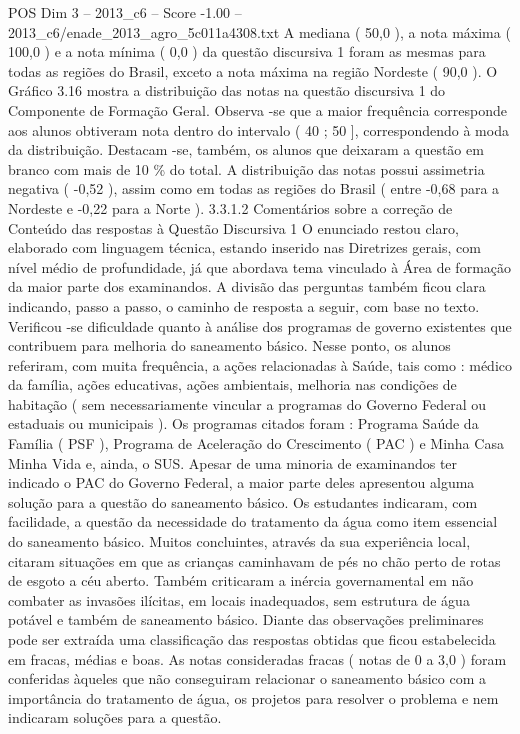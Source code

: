 \begin{textsample}{POS Dim 3 – 2013\_c6 – Score -1.00 – 2013\_c6/enade\_2013\_agro\_5c011a4308.txt}
A mediana ( 50,0 ), a nota máxima ( 100,0 ) e a nota mínima ( 0,0 ) da questão discursiva 1 foram as mesmas para todas as regiões do Brasil, exceto a nota máxima na região Nordeste ( 90,0 ).
O Gráfico 3.16 mostra a distribuição das notas na questão discursiva 1 do Componente de Formação Geral.
Observa -se que a maior frequência corresponde aos alunos obtiveram nota dentro do intervalo ( 40 ; 50 ], correspondendo à moda da distribuição.
Destacam -se, também, os alunos que deixaram a questão em branco com mais de 10 \% do total.
A distribuição das notas possui assimetria negativa ( -0,52 ), assim como em todas as regiões do Brasil ( entre -0,68 para a Nordeste e -0,22 para a Norte ). 3.3.1.2 Comentários sobre a correção de Conteúdo das respostas à Questão Discursiva 1 O enunciado restou claro, elaborado com linguagem técnica, estando inserido nas Diretrizes gerais, com nível médio de profundidade, já que abordava tema vinculado à Área de formação da maior parte dos examinandos.
A divisão das perguntas também ficou clara indicando, passo a passo, o caminho de resposta a seguir, com base no texto.
Verificou -se dificuldade quanto à análise dos programas de governo existentes que contribuem para melhoria do saneamento básico.
Nesse ponto, os alunos referiram, com muita frequência, a ações relacionadas à Saúde, tais como : médico da família, ações educativas, ações ambientais, melhoria nas condições de habitação ( sem necessariamente vincular a programas do Governo Federal ou estaduais ou municipais ).
Os programas citados foram : Programa Saúde da Família ( PSF ), Programa de Aceleração do Crescimento ( PAC ) e Minha Casa Minha Vida e, ainda, o SUS.
Apesar de uma minoria de examinandos ter indicado o PAC do Governo Federal, a maior parte deles apresentou alguma solução para a questão do saneamento básico.
Os estudantes indicaram, com facilidade, a questão da necessidade do tratamento da água como item essencial do saneamento básico.
Muitos concluintes, através da sua experiência local, citaram situações em que as crianças caminhavam de pés no chão perto de rotas de esgoto a céu aberto.
Também criticaram a inércia governamental em não combater as invasões ilícitas, em locais inadequados, sem estrutura de água potável e também de saneamento básico.
Diante das observações preliminares pode ser extraída uma classificação das respostas obtidas que ficou estabelecida em fracas, médias e boas.
As notas consideradas fracas ( notas de 0 a 3,0 ) foram conferidas àqueles que não conseguiram relacionar o saneamento básico com a importância do tratamento de água, os projetos para resolver o problema e nem indicaram soluções para a questão.

\end{textsample}
